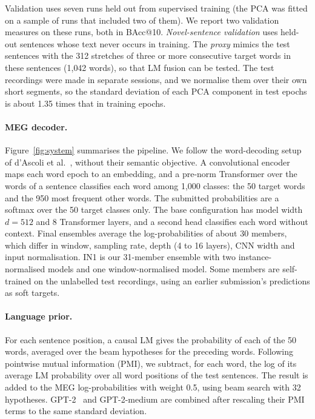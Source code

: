 \documentclass{article}
\begin{document}
Validation uses seven runs held out from supervised training (the PCA was fitted on a sample of runs that included two of them). We report two validation measures on these runs, both in BAcc@10. \emph{Novel-sentence validation} uses held-out sentences whose text never occurs in training. The \emph{proxy} mimics the test sentences with the 312 stretches of three or more consecutive target words in these sentences (1{,}042 words), so that LM fusion can be tested. The test recordings were made in separate sessions, and we normalise them over their own short segments, so the standard deviation of each PCA component in test epochs is about 1.35 times that in training epochs.

\paragraph{MEG decoder.} Figure~\ref{fig:system} summarises the pipeline. We follow the word-decoding setup of d'Ascoli et al.~\cite{dascoli2025}, without their semantic objective. A convolutional encoder maps each word epoch to an embedding, and a pre-norm Transformer over the words of a sentence classifies each word among 1{,}000 classes: the 50 target words and the 950 most frequent other words. The submitted probabilities are a softmax over the 50 target classes only. The base configuration has model width $d{=}512$ and 8 Transformer layers, and a second head classifies each word without context. Final ensembles average the log-probabilities of about 30 members, which differ in window, sampling rate, depth (4 to 16 layers), CNN width and input normalisation. IN1 is our 31-member ensemble with two instance-normalised models and one window-normalised model. Some members are self-trained on the unlabelled test recordings, using an earlier submission's predictions as soft targets.

\paragraph{Language prior.} For each sentence position, a causal LM gives the probability of each of the 50 words, averaged over the beam hypotheses for the preceding words. Following pointwise mutual information (PMI), we subtract, for each word, the log of its average LM probability over all word positions of the test sentences. The result is added to the MEG log-probabilities with weight 0.5, using beam search with 32 hypotheses. GPT-2~\cite{radford2019} and GPT-2-medium are combined after rescaling their PMI terms to the same standard deviation.
\end{document}
